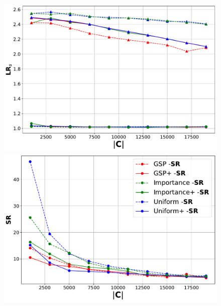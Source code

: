 \begin{figure}
\centering
    \begin{minipage}{0.49\linewidth}
        \centering
        \includegraphics[width=\linewidth]{./fig/loss_ratio(0.05,0.2) - MNIST.pdf}
    \end{minipage}
    \hfill
    \begin{minipage}{0.49\linewidth}
        \centering
        \includegraphics[width=\linewidth]{./fig/time_ratio(0.05,0.2) - MNIST.pdf}
    \end{minipage}
    \\
    \begin{minipage}{0.49\linewidth}
        \centering

\end{minipage}
\end{figure}
